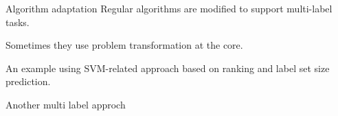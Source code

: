 \begin{frame}{Algorithm adaptation}
	Regular algorithms are modified to support multi-label tasks.
	
	Sometimes they use problem transformation at the core.
	
	An example using SVM-related approach based on ranking and label set size prediction.
\end{frame}

\begin{frame}{Another multi label approch}
	
	\cite{ml1}
\end{frame}